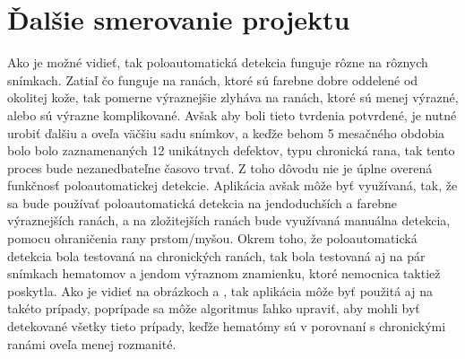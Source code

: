 \section{Ďalšie smerovanie projektu}
Ako je možné vidieť, tak poloautomatická detekcia funguje rôzne na rôznych snímkach. Zatiaľ čo funguje na ranách, ktoré sú farebne dobre oddelené od okolitej kože, tak pomerne výraznejšie zlyháva na ranách, ktoré sú menej výrazné, alebo sú výrazne komplikované. Avšak aby boli tieto tvrdenia potvrdené, je nutné urobiť ďalšiu a oveľa väčšiu sadu snímkov, a keďže behom 5 mesačného obdobia bolo bolo zaznamenaných 12 unikátnych defektov, typu chronická rana, tak tento proces bude nezanedbateľne časovo trvať. Z toho dôvodu nie je úplne overená funkčnosť poloautomatickej detekcie. Aplikácia avšak môže byť využívaná, tak, že sa bude používať poloautomatická detekcia na jendoduchších a farebne výraznejších ranách, a na zložitejších ranách bude využívaná manuálna detekcia, pomocu ohraničenia rany prstom/myšou. Okrem toho, že poloautomatická detekcia bola testovaná na chronických ranách, tak bola testovaná aj na pár snímkach hematomov a jendom výraznom znamienku, ktoré nemocnica taktiež poskytla. Ako je vidieť na obrázkoch \label{fig:w2} a \label{fig:w3}, tak aplikácia môže byť použitá aj na takéto prípady, poprípade sa môže algoritmus ľahko upraviť, aby mohli byť detekované všetky tieto prípady, keďže hematómy sú v porovnaní s chronickými ranámi oveľa menej rozmanité.
